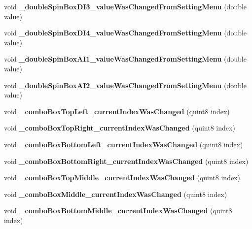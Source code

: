 \begin{DoxyCompactItemize}
\item 
\mbox{\label{class_setting_window_ab0470664c9c1fd827be1b4e844a9a460}} 
void {\bfseries \+\_\+double\+Spin\+Box\+D\+I3\+\_\+value\+Was\+Changed\+From\+Setting\+Menu} (double value)
\item 
\mbox{\label{class_setting_window_a578783c332caadea28728b7e59bd5095}} 
void {\bfseries \+\_\+double\+Spin\+Box\+D\+I4\+\_\+value\+Was\+Changed\+From\+Setting\+Menu} (double value)
\item 
\mbox{\label{class_setting_window_a8c35fc1ba0ab7d7144043a6780183a2b}} 
void {\bfseries \+\_\+double\+Spin\+Box\+A\+I1\+\_\+value\+Was\+Changed\+From\+Setting\+Menu} (double value)
\item 
\mbox{\label{class_setting_window_afcf898809909d129681317ba6d748853}} 
void {\bfseries \+\_\+double\+Spin\+Box\+A\+I2\+\_\+value\+Was\+Changed\+From\+Setting\+Menu} (double value)
\item 
\mbox{\label{class_setting_window_a878d5c7679a48f5c5b6c97c785a35164}} 
void {\bfseries \+\_\+combo\+Box\+Top\+Left\+\_\+current\+Index\+Was\+Changed} (quint8 index)
\item 
\mbox{\label{class_setting_window_a0151230f32cda4b1501d168f0d1bbb0c}} 
void {\bfseries \+\_\+combo\+Box\+Top\+Right\+\_\+current\+Index\+Was\+Changed} (quint8 index)
\item 
\mbox{\label{class_setting_window_a5e36e8d51d31c20ec347c053894cd032}} 
void {\bfseries \+\_\+combo\+Box\+Bottom\+Left\+\_\+current\+Index\+Was\+Changed} (quint8 index)
\item 
\mbox{\label{class_setting_window_ad57c377b4290cbfaefe3b6a18140469c}} 
void {\bfseries \+\_\+combo\+Box\+Bottom\+Right\+\_\+current\+Index\+Was\+Changed} (quint8 index)
\item 
\mbox{\label{class_setting_window_a449e5bcb59866f376bcd2ea3d3c552fa}} 
void {\bfseries \+\_\+combo\+Box\+Top\+Middle\+\_\+current\+Index\+Was\+Changed} (quint8 index)
\item 
\mbox{\label{class_setting_window_a5fd238e4171639f49ff78f5363f16024}} 
void {\bfseries \+\_\+combo\+Box\+Middle\+\_\+current\+Index\+Was\+Changed} (quint8 index)
\item 
\mbox{\label{class_setting_window_a6686e2d9eb123c939768becf2ac42ccf}} 
void {\bfseries \+\_\+combo\+Box\+Bottom\+Middle\+\_\+current\+Index\+Was\+Changed} (quint8 index)
\end{DoxyCompactItemize}

